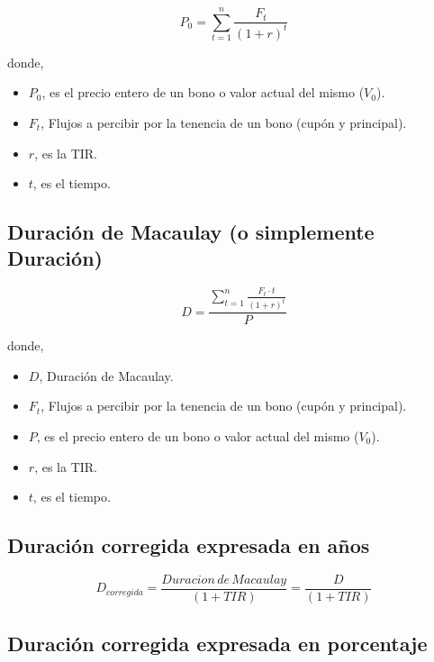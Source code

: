 \documentclass[
  letterpaper,
  DIV=11,
  numbers=noendperiod]{scrreprt}
\begin{document}
\begin{tcolorbox}
\[P_0=\sum_{ t=1}^{ n}\frac{F_t}{(1+r)^{t}}\]

donde,

\begin{itemize}
\item
  \(P_0\), es el precio entero de un bono o valor actual del mismo
  (\(V_0\)).
\item
  \(F_t\), Flujos a percibir por la tenencia de un bono (cupón y
  principal).
\item
  \(r\), es la TIR.
\item
  \(t\), es el tiempo.
\end{itemize}

\subsection*{Duración de Macaulay (o simplemente
Duración)}\label{duraciuxf3n-de-macaulay-o-simplemente-duraciuxf3n}

\[D=\frac{\sum_{t=1}^{n}\frac{F_t\cdot t}{\left(1+r\right)^t}}{P}\]

donde,

\begin{itemize}
\item
  \(D\), Duración de Macaulay.
\item
  \(F_t\), Flujos a percibir por la tenencia de un bono (cupón y
  principal).
\item
  \(P\), es el precio entero de un bono o valor actual del mismo
  (\(V_0\)).
\item
  \(r\), es la TIR.
\item
  \(t\), es el tiempo.
\end{itemize}

\subsection*{Duración corregida expresada en
años}\label{duraciuxf3n-corregida-expresada-en-auxf1os}

\[D_{corregida}=\frac{Duracion\,de\, Macaulay}{\left(1+TIR\right)}=\frac{D}{\left(1+TIR\right)} \]

\subsection*{Duración corregida expresada en
porcentaje}\label{duraciuxf3n-corregida-expresada-en-porcentaje}


\end{tcolorbox}
\end{document}
